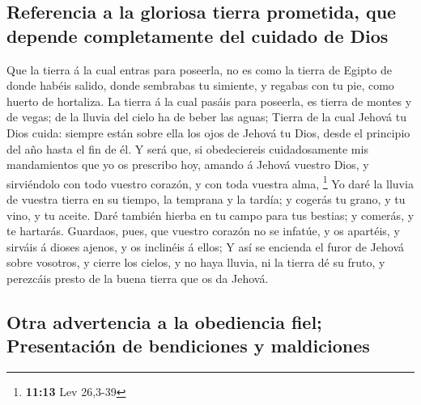 \hypertarget{referencia-a-la-gloriosa-tierra-prometida-que-depende-completamente-del-cuidado-de-dios}{%
\subsection{Referencia a la gloriosa tierra prometida, que depende
completamente del cuidado de
Dios}\label{referencia-a-la-gloriosa-tierra-prometida-que-depende-completamente-del-cuidado-de-dios}}

 Que la tierra á la cual entras para poseerla, no es como
la tierra de Egipto de donde habéis salido, donde sembrabas tu simiente,
y regabas con tu pie, como huerto de hortaliza.  La tierra
á la cual pasáis para poseerla, es tierra de montes y de vegas; de la
lluvia del cielo ha de beber las aguas;  Tierra de la cual
Jehová tu Dios cuida: siempre están sobre ella los ojos de Jehová tu
Dios, desde el principio del año hasta el fin de él.  Y
será que, si obedeciereis cuidadosamente mis mandamientos que yo os
prescribo hoy, amando á Jehová vuestro Dios, y sirviéndolo con todo
vuestro corazón, y con toda vuestra alma, \footnote{\textbf{11:13} Lev
  26,3-39}  Yo daré la lluvia de vuestra tierra en su
tiempo, la temprana y la tardía; y cogerás tu grano, y tu vino, y tu
aceite.  Daré también hierba en tu campo para tus bestias;
y comerás, y te hartarás.  Guardaos, pues, que vuestro
corazón no se infatúe, y os apartéis, y sirváis á dioses ajenos, y os
inclinéis á ellos;  Y así se encienda el furor de Jehová
sobre vosotros, y cierre los cielos, y no haya lluvia, ni la tierra dé
su fruto, y perezcáis presto de la buena tierra que os da Jehová.

\hypertarget{otra-advertencia-a-la-obediencia-fiel-presentaciuxf3n-de-bendiciones-y-maldiciones}{%
\subsection{Otra advertencia a la obediencia fiel; Presentación de
bendiciones y
maldiciones}\label{otra-advertencia-a-la-obediencia-fiel-presentaciuxf3n-de-bendiciones-y-maldiciones}}

